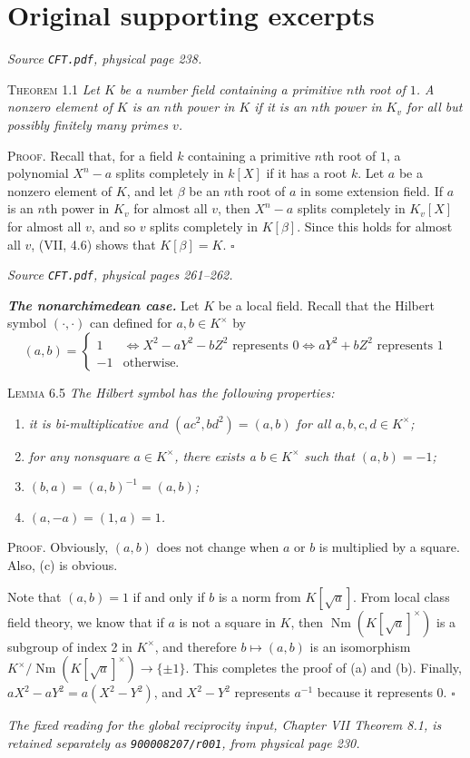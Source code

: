 \documentclass[11pt,a4paper]{article}
\begin{document}
\section*{Original supporting excerpts}
\noindent\emph{Source \texttt{CFT.pdf}, physical page 238.}\par\medskip
\noindent\textsc{Theorem 1.1}
\emph{Let $K$ be a number field containing a primitive $n$th root of $1$.
A nonzero element of $K$ is an $n$th power in $K$ if it is an $n$th
power in $K_v$ for all but possibly finitely many primes $v$.}

\noindent\textsc{Proof.} Recall that, for a field $k$ containing a primitive
$n$th root of $1$, a polynomial $X^n-a$ splits completely in $k[X]$ if
it has a root $k$. Let $a$ be a nonzero element of $K$, and let $\beta$
be an $n$th root of $a$ in some extension field. If $a$ is an $n$th power
in $K_v$ for almost all $v$, then $X^n-a$ splits completely in $K_v[X]$
for almost all $v$, and so $v$ splits completely in $K[\beta]$. Since
this holds for almost all $v$, (VII, 4.6) shows that $K[\beta]=K$.
\hfill$\square$

\medskip
\noindent\emph{Source \texttt{CFT.pdf}, physical pages 261--262.}\par\medskip
\noindent\textbf{\textit{The nonarchimedean case.}} Let $K$ be a local
field. Recall that the Hilbert symbol $(\cdot,\cdot)$ can defined for
$a,b\in K^\times$ by
\[
(a,b)=\begin{cases}
1 &\Longleftrightarrow X^2-aY^2-bZ^2\text{ represents }0
  \Longleftrightarrow aY^2+bZ^2\text{ represents }1\\
-1 &\text{otherwise.}
\end{cases}
\]

\noindent\textsc{Lemma 6.5}
\emph{The Hilbert symbol has the following properties:}
\begin{enumerate}
\renewcommand{\labelenumi}{(\alph{enumi})}
\item \emph{it is bi-multiplicative and $(ac^2,bd^2)=(a,b)$ for all
$a,b,c,d\in K^\times$;}
\item \emph{for any nonsquare $a\in K^\times$, there exists a
$b\in K^\times$ such that $(a,b)=-1$;}
\item \emph{$(b,a)=(a,b)^{-1}=(a,b)$;}
\item \emph{$(a,-a)=(1,a)=1$.}
\end{enumerate}
\noindent\textsc{Proof.} Obviously, $(a,b)$ does not change when $a$ or
$b$ is multiplied by a square. Also, (c) is obvious.

Note that $(a,b)=1$ if and only if $b$ is a norm from $K[\sqrt{a}]$.
From local class field theory, we know that if $a$ is not a square in
$K$, then $\operatorname{Nm}(K[\sqrt{a}]^\times)$ is a subgroup of
index 2 in $K^\times$, and therefore $b\longmapsto(a,b)$ is an
isomorphism $K^\times/\operatorname{Nm}(K[\sqrt{a}]^\times)
\longrightarrow\{\pm1\}$. This completes the proof of (a) and (b).
Finally, $aX^2-aY^2=a(X^2-Y^2)$, and $X^2-Y^2$ represents $a^{-1}$
because it represents $0$. \hfill$\square$

\medskip
\noindent\emph{The fixed reading for the global reciprocity input,
Chapter VII Theorem 8.1, is retained separately as
\texttt{900008207/r001}, from physical page 230.}
\end{document}
